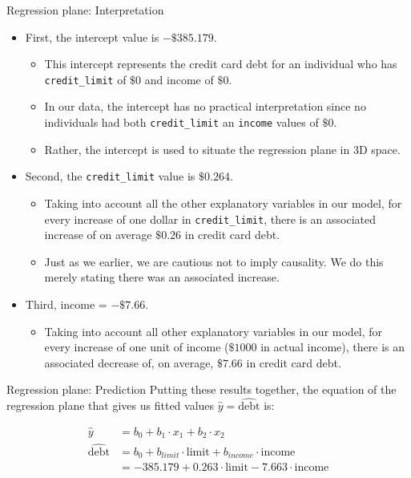 \documentclass[
  ignorenonframetext,
]{beamer}
\providecommand{\tightlist}{%
  \setlength{\itemsep}{0pt}\setlength{\parskip}{0pt}}
\begin{document}
\begin{frame}[fragile]{Regression plane: Interpretation}
\protect\hypertarget{regression-plane-interpretation}{}
\begin{itemize}
\item
  First, the intercept value is \(-\$385.179\).

  \begin{itemize}
  \tightlist
  \item
    This intercept represents the credit card debt for an individual who
    has \texttt{credit\_limit} of \(\$0\) and income of \(\$0\).
  \item
    In our data, the intercept has no practical interpretation since no
    individuals had both \texttt{credit\_limit} an \texttt{income}
    values of \(\$0\).
  \item
    Rather, the intercept is used to situate the regression plane in 3D
    space.
  \end{itemize}
\item
  Second, the \texttt{credit\_limit} value is \(\$0.264\).

  \begin{itemize}
  \tightlist
  \item
    Taking into account all the other explanatory variables in our
    model, for every increase of one dollar in \texttt{credit\_limit},
    there is an associated increase of on average \(\$0.26\) in credit
    card debt.
  \item
    Just as we earlier, we are cautious not to imply causality. We do
    this merely stating there was an associated increase.
  \end{itemize}
\item
  Third, income = \(-\$7.66\).

  \begin{itemize}
  \tightlist
  \item
    Taking into account all other explanatory variables in our model,
    for every increase of one unit of income (\(\$1000\) in actual
    income), there is an associated decrease of, on average, \(\$7.66\)
    in credit card debt.
  \end{itemize}
\end{itemize}
\end{frame}

\begin{frame}{Regression plane: Prediction}
\protect\hypertarget{regression-plane-prediction}{}
Putting these results together, the equation of the regression plane
that gives us fitted values \(\hat{y}=\widehat{\text{debt}}\) is:

\[\begin{array}{ll}
\hat{y}&=b_0+b_1\cdot x_1+b_2\cdot x_2\\
\widehat{\text{debt}}&=b_0+b_{limit}\cdot \text{limit}+b_{income}\cdot \text{income}\\
&=-385.179+0.263 \cdot \text{limit}- 7.663\cdot \text{income}
\end{array}\]
\end{frame}
\end{document}
